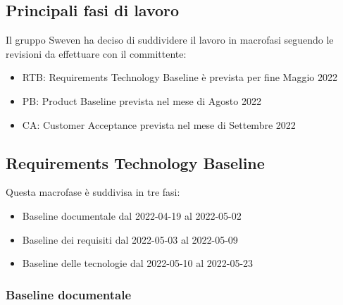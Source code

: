 \subsection{Principali fasi di lavoro}
Il gruppo Sweven ha deciso di suddividere il lavoro in macrofasi seguendo le revisioni da effettuare con il committente:
\begin{itemize}
    \item{RTB:} Requirements Technology Baseline è prevista per fine Maggio 2022
    \item {PB:} Product Baseline prevista nel mese di Agosto 2022
    \item {CA:} Customer Acceptance prevista nel mese di Settembre 2022
\end{itemize}

\subsection{Requirements Technology Baseline}
Questa macrofase è suddivisa in tre fasi:
\begin{itemize}
    \item{Baseline documentale} dal 2022-04-19 al 2022-05-02
    \item {Baseline dei requisiti} dal 2022-05-03 al 2022-05-09
    \item {Baseline delle tecnologie} dal 2022-05-10 al 2022-05-23
\end{itemize}

\subsubsection{Baseline documentale}